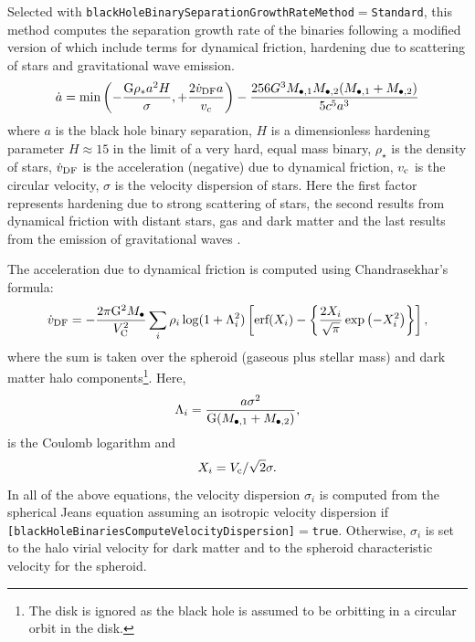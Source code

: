 Selected with {\tt blackHoleBinarySeparationGrowthRateMethod}$=${\tt Standard}, this method computes the separation growth rate of the binaries following a modified version of \cite {volonteri_assembly_2003} which include terms for dynamical friction, hardening due to scattering of stars and gravitational wave emission.
\begin{equation}
\dot{a} = \hbox{min} \left( - \frac{{\rm G}\rho _{*}a^2 H}{\sigma}, +\frac{2 \dot{v}_{\rm DF} a}{v_c} \right) - \frac{256 G^3 M_{\bullet, 1} M_{\bullet, 2} (M_{\bullet, 1} +M_{\bullet, 2})}{5 c^5 a^3}
\end{equation}
where $a$ is the black hole binary
separation, $H$ is a dimensionless hardening parameter $H\approx 15$ in the limit of 
a very hard, equal mass binary, $\rho _\star$ is the density of stars,
$\dot{v}_{\rm DF}$ is the acceleration (negative) due to dynamical friction,
$v_{\rm c}$ is the circular velocity, $\sigma$ is the velocity dispersion of stars. Here the first factor represents hardening due to strong scattering of stars, the second results from dynamical friction with distant stars, gas and dark matter and the last results from the emission of gravitational waves \cite{peters_gravitational_1964}.

The acceleration due to dynamical friction is computed using Chandrasekhar's formula:
\begin{equation}
 \dot{v}_{\rm DF}=- {2 \pi {\rm G}^2 M_\bullet \over V_{\rm C}^2} \sum_{i} \rho_i \log(1+\Lambda_i^2) \left[ \hbox{erf}(X_i)-\left\{ {2 X_i \over \sqrt{\pi}} \exp\left(-X_i^2\right) \right\} \right],
\end{equation}
where the sum is taken over the spheroid (gaseous plus stellar mass) and dark matter halo components\footnote{The disk is ignored as the black hole is assumed to be orbitting in a circular orbit in the disk.}. Here,
\begin{equation}
\Lambda_i =  {a \sigma^2  \over {\rm G}(M_{\bullet, 1}+M_{\bullet, 2})},
\end{equation}
is the Coulomb logarithm and
\begin{equation}
X_i = V_{\rm c} / \sqrt{2} \sigma.
\end{equation}
In all of the above equations, the velocity dispersion $\sigma_i$ is computed from the spherical Jeans equation assuming an isotropic velocity dispersion if {\tt [blackHoleBinariesComputeVelocityDispersion]}$=${\tt true}. Otherwise, $\sigma_i$ is set to the halo virial velocity for dark matter and to the spheroid characteristic velocity for the spheroid.


